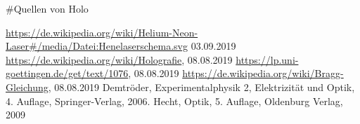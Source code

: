 #Quellen von Holo
\begin{thebibliography}{xxx}
        \url{https://de.wikipedia.org/wiki/Helium-Neon-Laser#/media/Datei:Henelaserschema.svg}
        03.09.2019
		\url{https://de.wikipedia.org/wiki/Holografie},
		08.08.2019
		\url{https://lp.uni-goettingen.de/get/text/1076},
		08.08.2019
		\url{https://de.wikipedia.org/wiki/Bragg-Gleichung},
		08.08.2019
	 Demtröder, Experimentalphysik 2, Elektrizität und Optik, 4. Auflage, Springer-Verlag, 2006.
     Hecht, Optik, 5. Auflage, Oldenburg Verlag, 2009
\end{thebibliography}
 
